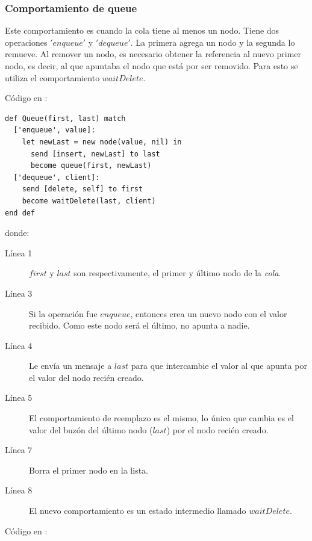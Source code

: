 \subsubsection*{Comportamiento de queue}
Este comportamiento es cuando la cola tiene al menos un nodo. Tiene dos operaciones $'enqueue'$ y $'dequeue'$. La primera agrega un nodo y la segunda lo remueve. Al remover un nodo, es necesario obtener la referencia al nuevo primer nodo, es decir, al que apuntaba el nodo que está por ser removido. Para esto se utiliza el comportamiento $waitDelete$.

Código en \SAL:

\begin{lstlisting}[language=sal, style=simple]
def Queue(first, last) match 
  ['enqueue', value]: 
    let newLast = new node(value, nil) in
      send [insert, newLast] to last
      become queue(first, newLast)
  ['dequeue', client]: 
    send [delete, self] to first
    become waitDelete(last, client)
end def
\end{lstlisting}
donde:
\begin{description}
 \item [Línea 1] $first$ y $last$ son respectivamente, el primer y último nodo de la \textit{cola}.
 \item [Línea 3] Si la operación fue $enqueue$, entonces crea un nuevo nodo con el valor recibido. Como este nodo será el último, no apunta a nadie.
 \item [Línea 4] Le envía un mensaje a $last$ para que intercambie el valor al que apunta por el valor del nodo recién creado.
 \item [Línea 5] El comportamiento de reemplazo es el mismo, lo único que cambia es el valor del buzón del último nodo ($last$) por el nodo recién creado.
 \item [Línea 7] Borra el primer nodo en la lista.
 \item [Línea 8] El nuevo comportamiento es un estado intermedio llamado $waitDelete$.
\end{description}

Código en \CSP:

